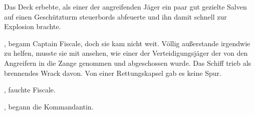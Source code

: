 \par

Das Deck erbebte, als einer der angreifenden Jäger ein paar gut gezielte Salven auf einen Geschützturm steuerbords abfeuerte und ihn damit schnell zur Explosion brachte.

\par

, begann Captain Fiscale, doch sie kam nicht weit. Völlig außerstande irgendwie zu helfen, musste sie mit ansehen, wie einer der Verteidigungsjäger der  von den Angreifern in die Zange genommen und abgeschossen wurde. Das Schiff trieb als brennendes Wrack davon. Von einer Rettungskapsel gab es keine Spur.

\par

, fauchte Fiscale.

\par


\par

, begann die Kommandantin. 
